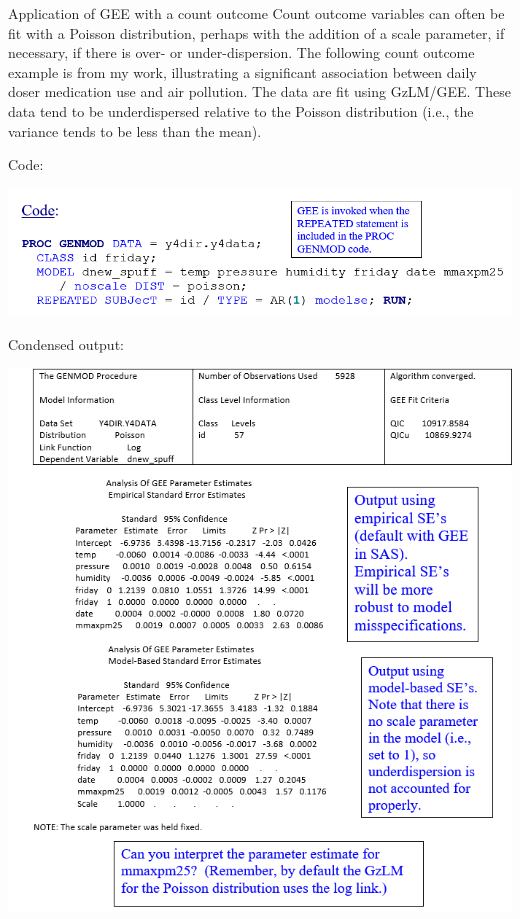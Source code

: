 \documentclass[
  9pt,
  ignorenonframetext,
]{beamer}
\begin{document}
\begin{frame}{Application of GEE with a count outcome}
\protect\hypertarget{application-of-gee-with-a-count-outcome}{}
Count outcome variables can often be fit with a Poisson distribution,
perhaps with the addition of a scale parameter, if necessary, if there
is over- or under-dispersion. The following count outcome example is
from my work, illustrating a significant association between daily doser
medication use and air pollution. The data are fit using GzLM/GEE. These
data tend to be underdispersed relative to the Poisson distribution
(i.e., the variance tends to be less than the mean).

Code:

\begin{center}\includegraphics[width=0.6\linewidth]{figs_L14/f3} \end{center}
\end{frame}

\begin{frame}{}
\protect\hypertarget{section-8}{}
Condensed output:

\begin{center}\includegraphics[width=0.8\linewidth]{figs_L14/f4} \end{center}
\end{frame}
\end{document}
